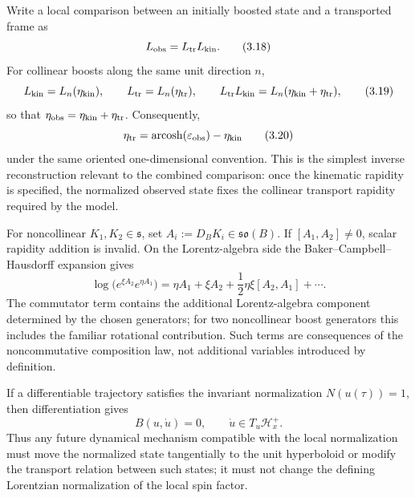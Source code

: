 \documentclass[11pt,a4paper]{article}
\theoremstyle{remark}
\newcommand{\soB}{\mathfrak{so}(B)}
\begin{document}
Write a local comparison between an initially boosted state and a transported frame as
\begin{equation}
  L_{\rm obs}=L_{\rm tr}L_{\rm kin}.
\tag{3.18}\label{eq:boost-composition}
\end{equation}
For collinear boosts along the same unit direction \(n\),
\begin{equation}
  L_{\rm kin}=L_n(\eta_{\rm kin}),
  \qquad
  L_{\rm tr}=L_n(\eta_{\rm tr}),
  \qquad
  L_{\rm tr}L_{\rm kin}=L_n(\eta_{\rm kin}+\eta_{\rm tr}),
\tag{3.19}\label{eq:rapidity-addition}
\end{equation}
so that \(\eta_{\rm obs}=\eta_{\rm kin}+\eta_{\rm tr}\).  Consequently,
\begin{equation}
  \eta_{\rm tr}
  =\operatorname{arcosh}(\varepsilon_{\rm obs})-\eta_{\rm kin}
\tag{3.20}\label{eq:transport-rapidity-inversion}
\end{equation}
under the same oriented one-dimensional convention.  This is the simplest inverse reconstruction relevant to the combined comparison: once the kinematic rapidity is specified, the normalized observed state fixes the collinear transport rapidity required by the model.

For noncollinear \(K_1,K_2\in\mathfrak s\), set \(A_i:=D_BK_i\in\soB\).  If \([A_1,A_2]\neq0\), scalar rapidity addition is invalid.  On the Lorentz-algebra side the Baker--Campbell--Hausdorff expansion gives
\begin{equation}
  \log\bigl(e^{\xi A_2}e^{\eta A_1}\bigr)
  =\eta A_1+\xi A_2
   +\frac12\eta\xi[A_2,A_1]+\cdots.
\tag{3.21}\label{eq:bch-combined}
\end{equation}
The commutator term contains the additional Lorentz-algebra component determined by the chosen generators; for two noncollinear boost generators this includes the familiar rotational contribution.  Such terms are consequences of the noncommutative composition law, not additional variables introduced by definition.

If a differentiable trajectory satisfies the invariant normalization \(N(u(\tau))=1\), then differentiation gives
\begin{equation}
  B(u,\dot u)=0,
  \qquad
  \dot u\in T_u\mathcal H_x^+.
\tag{3.22}\label{eq:tangent-mass-shell}
\end{equation}
Thus any future dynamical mechanism compatible with the local normalization must move the normalized state tangentially to the unit hyperboloid or modify the transport relation between such states; it must not change the defining Lorentzian normalization of the local spin factor.
\end{document}
